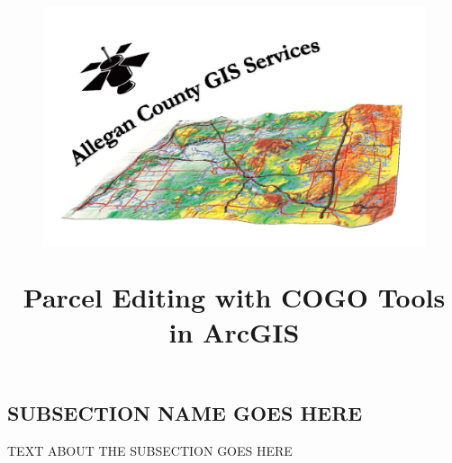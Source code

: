 \documentclass[class=book , crop=false]{standalone}
\title{ %
\HRule %
\\[.4cm] %
\begin{figure}[H] %
\begin{center}	%
	\includegraphics[scale=.45]{../../../../source/GIS_Logo_better.jpg}
	\end{center}
	\end{figure}
	\Huge \bfseries Parcel Editing with COGO Tools in ArcGIS %
\HRule \\[.4cm] %
}  %
\begin{document}

\subsection{SUBSECTION NAME GOES HERE}
TEXT ABOUT THE SUBSECTION GOES HERE

%
%
%
%
\end{document}
